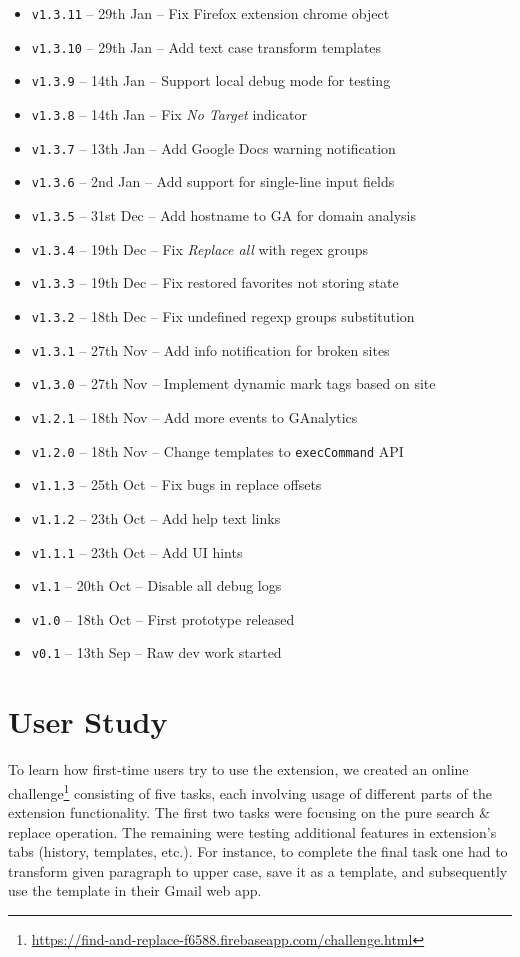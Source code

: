 \documentclass[bsc,frontabs,twoside,singlespacing,parskip,deptreport]{infthesis}
\providecommand{\tightlist}{%
  \setlength{\itemsep}{0pt}\setlength{\parskip}{0pt}}
\begin{document}
\begin{itemize}
\tightlist
\item
\texttt{v1.3.11} -- 29th Jan -- Fix Firefox extension chrome object
\item
\texttt{v1.3.10} -- 29th Jan -- Add text case transform templates
\item
\texttt{v1.3.9} -- 14th Jan -- Support local debug mode for testing
\item
\texttt{v1.3.8} -- 14th Jan -- Fix \textit{No Target} indicator
\item
\texttt{v1.3.7} -- 13th Jan -- Add Google Docs warning notification
\item
\texttt{v1.3.6} -- 2nd Jan -- Add support for single-line input fields
\item
\texttt{v1.3.5} -- 31st Dec -- Add hostname to GA for domain analysis
\item
\texttt{v1.3.4} -- 19th Dec -- Fix \textit{Replace all} with regex groups
\item
\texttt{v1.3.3} -- 19th Dec -- Fix restored favorites not storing state
\item
\texttt{v1.3.2} -- 18th Dec -- Fix undefined regexp groups substitution
\item
\texttt{v1.3.1} -- 27th Nov -- Add info notification for broken sites
\item
\texttt{v1.3.0} -- 27th Nov -- Implement dynamic mark tags based on site
\item
\texttt{v1.2.1} -- 18th Nov -- Add more events to GAnalytics
\item
\texttt{v1.2.0} -- 18th Nov -- Change templates to \texttt{execCommand} API
\item
\texttt{v1.1.3} -- 25th Oct -- Fix bugs in replace offsets
\item
\texttt{v1.1.2} -- 23th Oct -- Add help text links
\item
\texttt{v1.1.1} -- 23th Oct -- Add UI hints
\item
\texttt{v1.1} -- 20th Oct -- Disable all debug logs
\item
\texttt{v1.0} -- 18th Oct -- First prototype released
\item
\texttt{v0.1} -- 13th Sep -- Raw dev work started
\end{itemize}

\section{User Study}
To learn how first-time users try to use the extension, we created an online challenge\footnote{\url{https://find-and-replace-f6588.firebaseapp.com/challenge.html}} consisting of five tasks, each involving usage of different parts of the extension functionality. The first two tasks were focusing on the pure search \& replace operation. The remaining were testing additional features in extension's tabs (history, templates, etc.). For instance, to complete the final task one had to transform given paragraph to upper case, save it as a template, and subsequently use the template in their Gmail web app.
\end{document}

